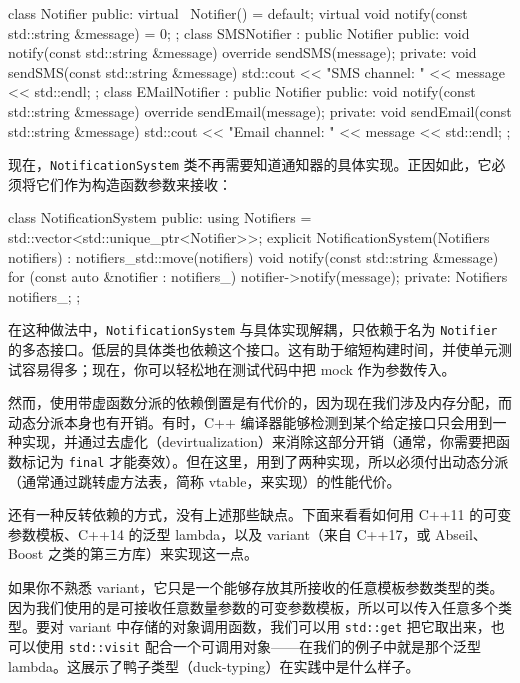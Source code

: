 \begin{codebox}[cpp]
class Notifier {
public:
    virtual ~Notifier() = default;
    virtual void notify(const std::string &message) = 0;
};
class SMSNotifier : public Notifier {
public:
    void notify(const std::string &message) override { sendSMS(message); }
private:
    void sendSMS(const std::string &message) {
        std::cout << "SMS channel: " << message << std::endl;
    }
};
class EMailNotifier : public Notifier {
public:
    void notify(const std::string &message) override { sendEmail(message); }
private:
    void sendEmail(const std::string &message) {
        std::cout << "Email channel: " << message << std::endl;
    }
};
\end{codebox}

\label{idx:059}
\label{idx:060}
现在，\texttt{Notification\allowbreak{}System} 类不再需要知道通知器的具体实现。正因如此，它必须将它们作为构造函数参数来接收：

\begin{codebox}[cpp]
class NotificationSystem {
public:
    using Notifiers = std::vector<std::unique_ptr<Notifier>>;
    explicit NotificationSystem(Notifiers notifiers)
        : notifiers_{std::move(notifiers)} {}
    void notify(const std::string &message) {
        for (const auto &notifier : notifiers_) {
            notifier->notify(message);
        }
    }
private:
    Notifiers notifiers_;
};
\end{codebox}

在这种做法中，\texttt{Notification\allowbreak{}System} 与具体实现解耦，只依赖于名为 \texttt{Notifier} 的多态接口。低层的具体类也依赖这个接口。这有助于缩短构建时间，并使单元测试容易得多；现在，你可以轻松地在测试代码中把 mock 作为参数传入。

\label{idx:061}
然而，使用带虚函数分派的依赖倒置是有代价的，因为现在我们涉及内存分配，而动态分派本身也有开销。有时，C++ 编译器能够检测到某个给定接口只会用到一种实现，并通过去虚化（devirtualization）来消除这部分开销（通常，你需要把函数标记为 \texttt{final} 才能奏效）。但在这里，用到了两种实现，所以必须付出动态分派（通常通过跳转虚方法表，简称 vtable，来实现）的性能代价。

还有一种反转依赖的方式，没有上述那些缺点。下面来看看如何用 C++11 的可变参数模板、C++14 的泛型 lambda，以及 variant（来自 C++17，或 Abseil、Boost 之类的第三方库）来实现这一点。

\label{idx:062}
\label{idx:063}
如果你不熟悉 variant，它只是一个能够存放其所接收的任意模板参数类型的类。因为我们使用的是可接收任意数量参数的可变参数模板，所以可以传入任意多个类型。要对 variant 中存储的对象调用函数，我们可以用 \texttt{std::get} 把它取出来，也可以使用 \texttt{std::\allowbreak{}visit} 配合一个可调用对象——在我们的例子中就是那个泛型 lambda。这展示了鸭子类型（duck-typing）在实践中是什么样子。

